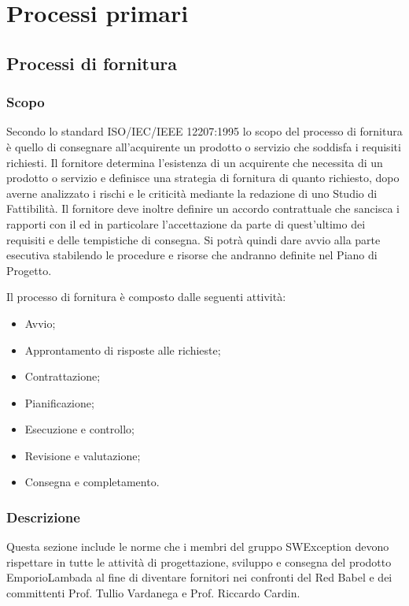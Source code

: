 \section{Processi primari}


\subsection{Processi di fornitura}
\label{_processiDiFornitura}
\subsubsection{Scopo}
Secondo lo standard ISO/IEC/IEEE 12207:1995 lo scopo del processo di fornitura è quello di consegnare all'acquirente un prodotto o servizio che soddisfa i requisiti richiesti.  Il fornitore determina l'esistenza di un acquirente che necessita di un prodotto o servizio e definisce una strategia di fornitura di quanto richiesto, dopo averne analizzato i rischi e le criticità mediante la redazione di uno Studio di Fattibilità.
Il fornitore deve inoltre definire un accordo contrattuale che sancisca i rapporti con il  ed in particolare l'accettazione da parte di quest'ultimo dei requisiti e delle tempistiche di consegna.  Si potrà quindi dare avvio alla parte esecutiva stabilendo le procedure e risorse che andranno definite nel Piano di Progetto.

Il processo di fornitura è composto dalle seguenti attività:
\begin{itemize}
  \item Avvio;
  \item Approntamento di risposte alle richieste;
  \item Contrattazione;
  \item Pianificazione;
  \item Esecuzione e controllo;
  \item Revisione e valutazione;
  \item Consegna e completamento.
\end{itemize}

\subsubsection{Descrizione}
Questa sezione include le norme che i membri del gruppo SWException devono rispettare in tutte le attività di progettazione, sviluppo e consegna del prodotto EmporioLambada al fine di diventare fornitori nei confronti del  Red Babel e dei committenti Prof. Tullio Vardanega e Prof. Riccardo Cardin.
